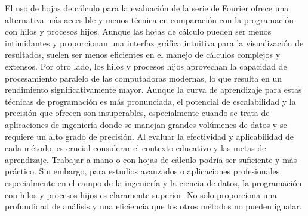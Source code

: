 El uso de hojas de cálculo para la evaluación de la serie de Fourier ofrece una alternativa más accesible y menos técnica en comparación con la programación con hilos y procesos hijos. Aunque las hojas de cálculo pueden ser menos intimidantes y proporcionan una interfaz gráfica intuitiva para la visualización de resultados, suelen ser menos eficientes en el manejo de cálculos complejos y extensos. Por otro lado, los hilos y procesos hijos aprovechan la capacidad de procesamiento paralelo de las computadoras modernas, lo que resulta en un rendimiento significativamente mayor. Aunque la curva de aprendizaje para estas técnicas de programación es más pronunciada, el potencial de escalabilidad y la precisión que ofrecen son insuperables, especialmente cuando se trata de aplicaciones de ingeniería donde se manejan grandes volúmenes de datos y se requiere un alto grado de precisión. Al evaluar la efectividad y aplicabilidad de cada método, es crucial considerar el contexto educativo y las metas de aprendizaje. Trabajar a mano o con hojas de cálculo podría ser suficiente y más práctico. Sin embargo, para estudios avanzados o aplicaciones profesionales, especialmente en el campo de la ingeniería y la ciencia de datos, la programación con hilos y procesos hijos es claramente superior. No solo proporciona una profundidad de análisis y una eficiencia que los otros métodos no pueden igualar.